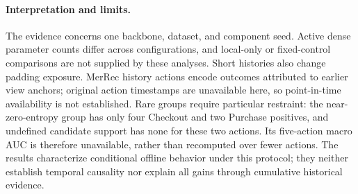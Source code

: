\paragraph{Interpretation and limits.}
The evidence concerns one backbone, dataset, and component seed. Active dense
parameter counts differ across configurations, and local-only or fixed-control
comparisons are not supplied by these analyses. Short histories also change
padding exposure. MerRec history actions encode outcomes attributed to earlier
view anchors; original action timestamps are unavailable here, so point-in-time
availability is not established. Rare groups require particular restraint:
the near-zero-entropy group has only four Checkout and two Purchase positives,
and undefined candidate support has none for these two actions. Its five-action
macro AUC is therefore unavailable, rather than recomputed over fewer actions.
The results characterize conditional offline behavior under this protocol;
they neither establish temporal causality nor explain all gains through cumulative
historical evidence.

